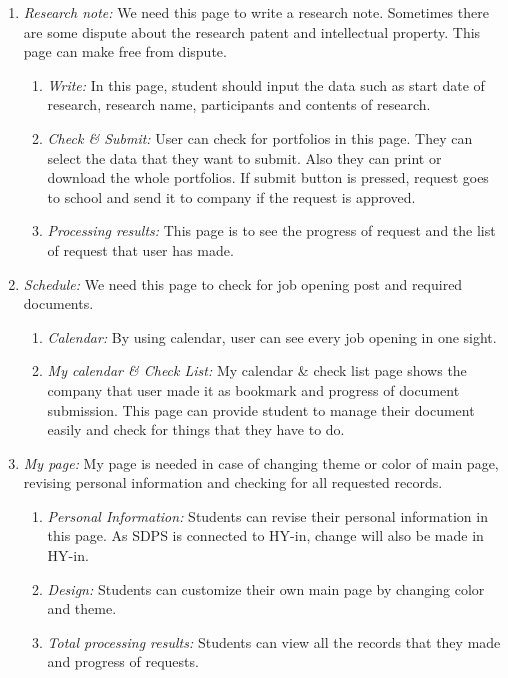 \documentclass[conference]{IEEEtran}
\begin{document}
\begin{enumerate}
       \item \textit {Research note:} We need this page to write a research note. Sometimes there are some dispute about the research patent and intellectual property. This page can make free from dispute. \\
    \begin{enumerate}
    	\item  \textit {Write:} In this page, student should input the data such as start date of research, research name, participants and contents of research.\\
        \item \textit {Check \& Submit:} User can check for portfolios in this page. They can select the data that they want to submit. Also they can print or download the whole portfolios. If submit button is pressed, request goes to school and send it to company if the request is approved.\\
        \item \textit {Processing results:} This page is to see the progress of request and the list of request that user has made.\\
    \end{enumerate}
    
       \item \textit {Schedule:} We need this page to check for job opening post and required documents. \\
    \begin{enumerate}
    	\item  \textit {Calendar:} By using calendar, user can see every job opening in one sight. \\
        \item \textit {My calendar \& Check List:} My calendar \& check list page shows the company that user made it as bookmark and progress of document submission. This page can provide student to manage their document easily and check for things that they have to do.  \\
    \end{enumerate}    
    
       \item \textit {My page:} My page is needed in case of changing theme or color of main page, revising personal information and checking for all requested records.\\
    \begin{enumerate}
    	\item  \textit {Personal Information:} Students can revise their personal information in this page. As SDPS is connected to HY-in, change will also be made in HY-in.\\
        \item \textit {Design:} Students can customize their own main page by changing color and theme. \\
        \item \textit {Total processing results:} Students can view all the records that they made and progress of requests.\\
    \end{enumerate}  
        
\end{enumerate}
\end{document}
